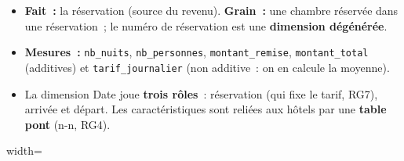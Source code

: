 \begin{itemize}
	\item \textbf{Fait~:} la réservation (source du revenu). \textbf{Grain~:} une chambre réservée dans une réservation~; le numéro de réservation est une \textbf{dimension dégénérée}.
	\item \textbf{Mesures~:} \texttt{nb\_nuits}, \texttt{nb\_personnes}, \texttt{montant\_remise}, \texttt{montant\_total} (additives) et \texttt{tarif\_journalier} (non additive~: on en calcule la moyenne).
	\item La dimension Date joue \textbf{trois rôles}~: réservation (qui fixe le tarif, RG7), arrivée et départ. Les caractéristiques sont reliées aux hôtels par une \textbf{table pont} (n-n, RG4).
\end{itemize}

\begin{center}
\begin{adjustbox}{width=\linewidth}
\end{adjustbox}
\end{center}
